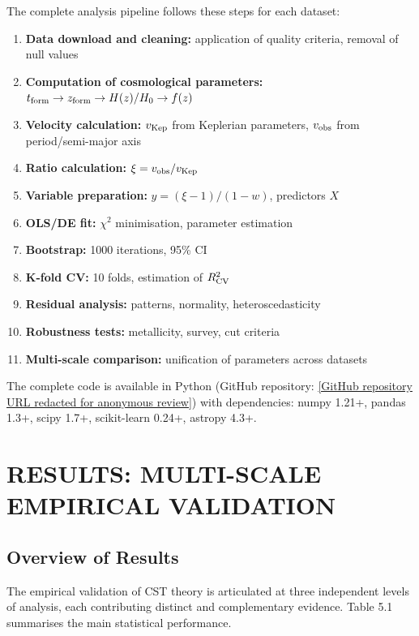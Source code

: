 \documentclass[10pt,a4paper]{article}
\providecommand{\tightlist}{\setlength{\itemsep}{0pt}\setlength{\parskip}{0pt}}
\begin{document}
The complete analysis pipeline follows these steps for each dataset:

\begin{enumerate}
\def\labelenumi{\arabic{enumi}.}
\tightlist
\item
  \textbf{Data download and cleaning:} application of quality criteria,
  removal of null values
\item
  \textbf{Computation of cosmological parameters:}
  \(t_{\rm form} \to z_{\rm form} \to H(z)/H_0 \to f(z)\)
\item
  \textbf{Velocity calculation:} \(v_{\rm Kep}\) from Keplerian
  parameters, \(v_{\rm obs}\) from period/semi-major axis
\item
  \textbf{Ratio calculation:} \(\xi = v_{\rm obs}/v_{\rm Kep}\)
\item
  \textbf{Variable preparation:} \(y = (\xi-1)/(1-w)\), predictors \(X\)
\item
  \textbf{OLS/DE fit:} \(\chi^2\) minimisation, parameter estimation
\item
  \textbf{Bootstrap:} 1000 iterations, 95\% CI
\item
  \textbf{K-fold CV:} 10 folds, estimation of \(R^2_{\rm CV}\)
\item
  \textbf{Residual analysis:} patterns, normality, heteroscedasticity
\item
  \textbf{Robustness tests:} metallicity, survey, cut criteria
\item
  \textbf{Multi-scale comparison:} unification of parameters across
  datasets
\end{enumerate}

The complete code is available in Python (GitHub repository:
\url{[GitHub repository URL redacted for anonymous review]})
with dependencies: numpy 1.21+, pandas 1.3+, scipy 1.7+, scikit-learn
0.24+, astropy 4.3+.

\section{RESULTS: MULTI-SCALE EMPIRICAL
VALIDATION}\label{results-multi-scale-empirical-validation}

\subsection{Overview of Results}\label{overview-of-results}

The empirical validation of CST theory is articulated at three
independent levels of analysis, each contributing distinct and
complementary evidence. Table 5.1 summarises the main statistical
performance.
\end{document}
